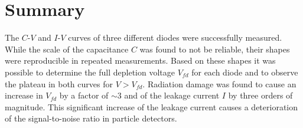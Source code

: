 \documentclass[11pt]{report}
\begin{document}
\section{Summary}
\label{sec:summary}

The $C$-$V$ and $I$-$V$ curves of three different diodes were successfully measured.
While the scale of the capacitance $C$ was found to not be reliable, their shapes were reproducible in repeated measurements.
Based on these shapes it was possible to determine the full depletion voltage $V_{fd}$ for each diode and to observe the plateau in both curves for $V>V_{fd}$.
Radiation damage was found to cause an increase in $V_{fd}$ by a factor of $\sim 3$ and of the leakage current $I$ by three orders of magnitude.
This significant increase of the leakage current causes a deterioration of the signal-to-noise ratio in particle detectors.

\printbibliography
\end{document}
